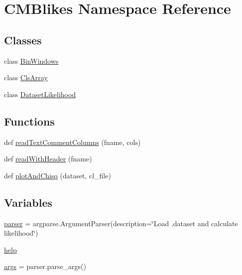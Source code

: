 \hypertarget{namespaceCMBlikes}{}\section{C\+M\+Blikes Namespace Reference}
\label{namespaceCMBlikes}
\subsection*{Classes}
\begin{DoxyCompactItemize}
\item 
class \mbox{\hyperlink{classCMBlikes_1_1BinWindows}{Bin\+Windows}}
\item 
class \mbox{\hyperlink{classCMBlikes_1_1ClsArray}{Cls\+Array}}
\item 
class \mbox{\hyperlink{classCMBlikes_1_1DatasetLikelihood}{Dataset\+Likelihood}}
\end{DoxyCompactItemize}
\subsection*{Functions}
\begin{DoxyCompactItemize}
\item 
def \mbox{\hyperlink{namespaceCMBlikes_aa9c169e941d230f2d4f17db4b2e9ab3d}{read\+Text\+Comment\+Columns}} (fname, cols)
\item 
def \mbox{\hyperlink{namespaceCMBlikes_a1466915350fd7dc3528979f6e8649244}{read\+With\+Header}} (fname)
\item 
def \mbox{\hyperlink{namespaceCMBlikes_a488e6ca1251023e06316164ef32d6f3f}{plot\+And\+Chisq}} (dataset, cl\+\_\+file)
\end{DoxyCompactItemize}
\subsection*{Variables}
\begin{DoxyCompactItemize}
\item 
\mbox{\hyperlink{namespaceCMBlikes_a0d371c3d532c4ee8265e18ca5c523bfc}{parser}} = argparse.\+Argument\+Parser(description=\char`\"{}Load .dataset and calculate likelihood\char`\"{})
\item 
\mbox{\hyperlink{namespaceCMBlikes_aea6f0127434b3fad44cad7a616b7d78f}{help}}
\item 
\mbox{\hyperlink{namespaceCMBlikes_a2f64c7f147e565478aa9fbfaac83d64f}{args}} = parser.\+parse\+\_\+args()
\end{DoxyCompactItemize}


